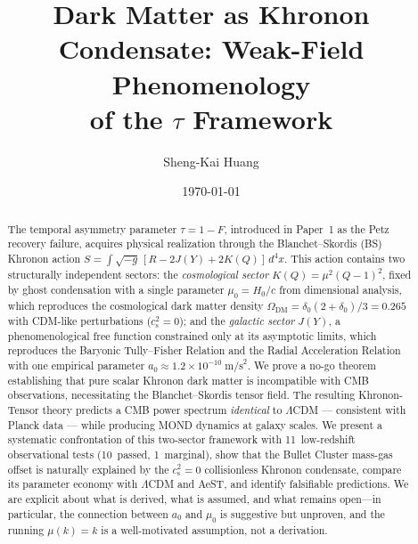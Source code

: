 \documentclass[prd,twocolumn,superscriptaddress,longbibliography,floatfix]{revtex4-2}
\newcommand{\tauasym}{\tau}
\newcommand{\cs}{c_{\mathrm{s}}}
\begin{document}
\title{Dark Matter as Khronon Condensate: Weak-Field Phenomenology\\
of the $\tauasym$ Framework}

\author{Sheng-Kai Huang}

\date{\today}

\begin{abstract}
The temporal asymmetry parameter $\tauasym = 1 - F$, introduced in
Paper~1 as the Petz recovery failure, acquires physical realization
through the Blanchet--Skordis (BS) Khronon action
$S = \int\!\sqrt{-g}\,[R - 2J(Y) + 2K(Q)]\,d^4x$.
This action contains two structurally independent sectors: the
\emph{cosmological sector} $K(Q) = \mu^2(Q-1)^2$, fixed by ghost
condensation with a single parameter $\mu_0 = H_0/c$ from
dimensional analysis, which reproduces the cosmological dark matter
density $\Omega_{\mathrm{DM}} = \delta_0(2{+}\delta_0)/3 = 0.265$
with CDM-like perturbations ($\cs^2 = 0$); and the
\emph{galactic sector} $J(Y)$, a phenomenological free function
constrained only at its asymptotic limits, which reproduces the
Baryonic Tully--Fisher Relation and the Radial Acceleration Relation
with one empirical parameter $a_0 \approx 1.2 \times 10^{-10}\;\mathrm{m/s}^2$.
We prove a no-go theorem establishing that pure scalar Khronon dark
matter is incompatible with CMB observations, necessitating the
Blanchet--Skordis tensor field. The resulting Khronon-Tensor theory
predicts a CMB power spectrum \emph{identical} to $\Lambda$CDM ---
consistent with Planck data --- while producing MOND dynamics at
galaxy scales.
We present a systematic confrontation of this two-sector framework
with 11~low-redshift observational tests (10~passed, 1~marginal),
show that the Bullet Cluster mass-gas offset is naturally explained
by the $\cs^2 = 0$ collisionless Khronon condensate, compare its
parameter economy with $\Lambda$CDM and AeST, and identify
falsifiable predictions.
We are explicit about what is derived, what is assumed, and what
remains open---in particular, the connection between $a_0$ and
$\mu_0$ is suggestive but unproven, and the running
$\mu(k) = k$ is a well-motivated assumption, not a derivation.
\end{abstract}

\maketitle


\end{document}
